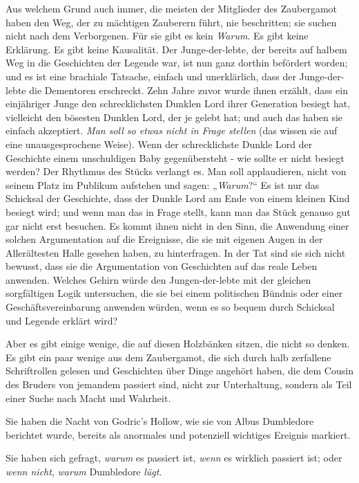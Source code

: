 {Aus welchem Grund auch immer, die meisten der Mitglieder des Zaubergamot haben den Weg, der zu mächtigen Zauberern führt, nie beschritten; sie suchen nicht nach dem Verborgenen. Für sie gibt es kein \emph{Warum}. Es gibt keine Erklärung. Es gibt keine Kausalität. Der Junge-der-lebte, der bereits auf halbem Weg in die Geschichten der Legende war, ist nun ganz dorthin befördert worden; und es ist eine brachiale Tatsache, einfach und unerklärlich, dass der Junge-der-lebte die Dementoren erschreckt. Zehn Jahre zuvor wurde ihnen erzählt, dass ein einjähriger Junge den schrecklichsten Dunklen Lord ihrer Generation besiegt hat, vielleicht den bösesten Dunklen Lord, der je gelebt hat; und auch das haben sie einfach akzeptiert. \emph{Man soll so etwas nicht in Frage stellen} (das wissen sie auf eine unausgesprochene Weise). Wenn der schrecklichste Dunkle Lord der Geschichte einem unschuldigen Baby gegenübersteht - wie sollte er nicht besiegt werden? Der Rhythmus des Stücks verlangt es. Man soll applaudieren, nicht von seinem Platz im Publikum aufstehen und sagen: „\emph{Warum}?“ Es ist nur das Schicksal der Geschichte, dass der Dunkle Lord am Ende von einem kleinen Kind besiegt wird; und wenn man das in Frage stellt, kann man das Stück genauso gut gar nicht erst besuchen. Es kommt ihnen nicht in den Sinn, die Anwendung einer solchen Argumentation auf die Ereignisse, die sie mit eigenen Augen in der Allerältesten Halle gesehen haben, zu hinterfragen. In der Tat sind sie sich nicht bewusst, dass sie die Argumentation von Geschichten auf das reale Leben anwenden. Welches Gehirn würde den Jungen-der-lebte mit der gleichen sorgfältigen Logik untersuchen, die sie bei einem politischen Bündnis oder einer Geschäftsvereinbarung anwenden würden, wenn es so bequem durch Schicksal und Legende erklärt wird?

Aber es gibt einige wenige, die auf diesen Holzbänken sitzen, die nicht so denken. Es gibt ein paar wenige aus dem Zaubergamot, die sich durch halb zerfallene Schriftrollen gelesen und Geschichten über Dinge angehört haben, die dem Cousin des Bruders von jemandem passiert sind, nicht zur Unterhaltung, sondern als Teil einer Suche nach Macht und Wahrheit.

Sie haben die Nacht von Godric's Hollow, wie sie von Albus Dumbledore berichtet wurde, bereits als anormales und potenziell wichtiges Ereignis markiert.

Sie haben sich gefragt, \emph{warum} es passiert ist, \emph{wenn} es wirklich passiert ist; oder \emph{wenn nicht}, \emph{warum} Dumbledore \emph{lügt}.

}
